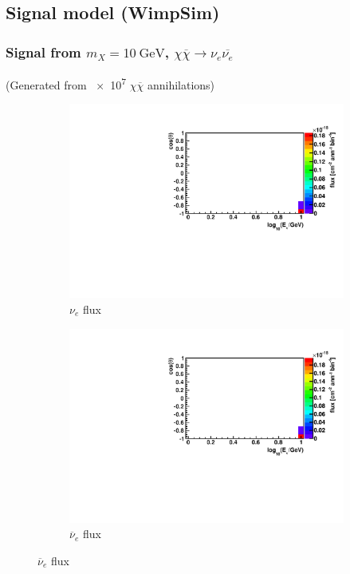 \documentclass{beamer}
\begin{document}
\subsection{Signal model (WimpSim)}
\begin{frame}
	\frametitle{Signal from $m_X = \SI{10}{\giga\electronvolt}$,
		$\chi \overline{\chi} \rightarrow \nu_{e} \overline{\nu_{e}}$}
	(Generated from \num{e7} $\chi \overline{\chi}$ annihilations)
	\begin{figure}
		\centering
		\begin{subfigure}[b]{0.49\linewidth}
			\caption*{ $\nu_{e}$ flux }
			\includegraphics[width=\linewidth]{hist_flux_nue_from_10gev_mx_to_nuenuebar.pdf}
		\end{subfigure}
		\begin{subfigure}[b]{0.49\linewidth}
			\caption*{ $\overline{\nu}_{e}$ flux }
			\includegraphics[width=\linewidth]{hist_flux_nuebar_from_10gev_mx_to_nuenuebar.pdf}
		\end{subfigure}
	\end{figure}
\end{frame}
\end{document}

